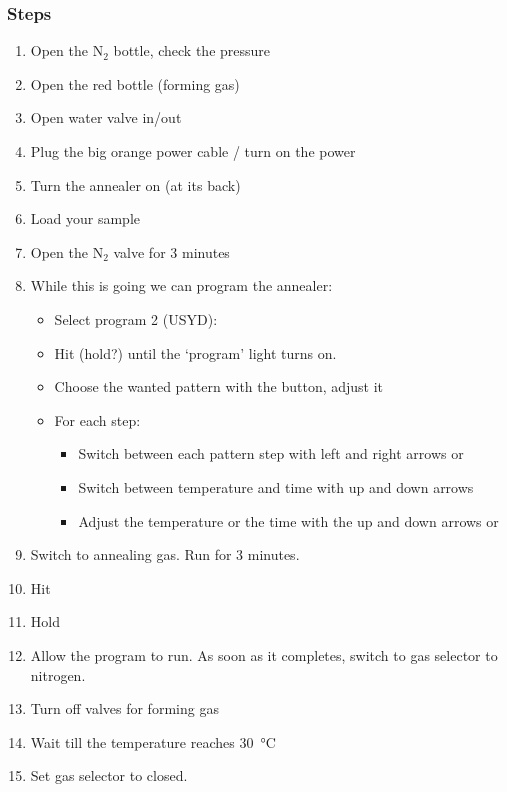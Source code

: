\documentclass[12pt,a4paper]{report}
\begin{document}
\subsubsection{Steps}
\begin{enumerate}
\item Open the N$_2$ bottle, check the pressure
\item Open the red bottle (forming gas)
\item Open water valve in/out
\item Plug the big orange power cable / turn on the power
\item Turn the annealer on (at its back)
\item Load your sample
\item Open the N$_2$ valve for 3 minutes
\item While this is going we can program the annealer:
\begin{itemize}[noitemsep,nolistsep]
  \item Select program 2 (USYD):
  \item Hit (hold?)  until the `program' light turns on.
  \item Choose the wanted pattern with the  button, adjust it
  \item For each step:
  \begin{itemize}[nolistsep,noitemsep]
    \item Switch between each pattern step with left and right arrows \boxed{<} or \boxed{>}
    \item Switch between temperature and time with up and down arrows
    \item Adjust the temperature or the time with the up and down arrows  or 
  \end{itemize}
\end{itemize}
\item Switch to annealing gas. Run for 3 minutes.
\item Hit 
\item Hold 
\item Allow the program to run. As soon as it completes, switch to gas selector to nitrogen.
\item Turn off valves for forming gas
\item Wait till the temperature reaches \SI{30}{\degreeCelsius}
\item Set gas selector to closed.
\end{enumerate}
\newpage
\end{document}
